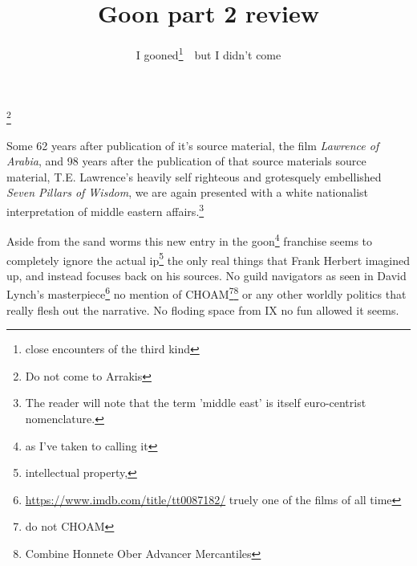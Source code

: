 \documentclass{article}
\title{Goon part 2 review}
\author{I gooned\footnote{close encounters of the third kind}\ \ but I didn't come}
\begin{document}
\maketitle

\noindent{}\footnote{Do not come to Arrakis}

\hfill \break

Some 62 years after publication of it's source material, the film \textit{Lawrence of Arabia}, and 98 years after the publication of that source materials source material, T.E. Lawrence's heavily self righteous and grotesquely embellished \textit{Seven Pillars of Wisdom}, we are again presented with a white nationalist interpretation of middle eastern affairs.\footnote{The reader will note that the term 'middle east' is itself euro-centrist nomenclature.}

Aside from the sand worms this new entry in the goon\footnote{as I've taken to calling it} franchise seems to completely ignore the actual ip\footnote{intellectual property,} the only real things that Frank Herbert imagined up, and instead focuses back on his sources. No guild navigators as seen in David Lynch's masterpiece\footnote{\href{https://www.imdb.com/title/tt0087182/}{https://www.imdb.com/title/tt0087182/} truely one of the films of all time} no mention of CHOAM\footnote{do not CHOAM}\footnote{Combine Honnete Ober Advancer Mercantiles} or any other worldly politics that really flesh out the narrative. No floding space from IX no fun allowed it seems.
\end{document}
